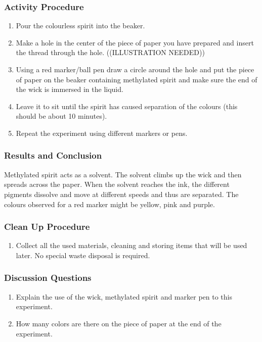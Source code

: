\subsubsection*{Activity Procedure}
\begin{enumerate}
\item{Pour the colourless spirit into the beaker.}
\item{Make a hole in the center of the piece of paper you have prepared and insert the thread through the hole. ((ILLUSTRATION NEEDED)) }
\item{Using a red marker/ball pen draw a circle around the hole and put the piece of paper on the beaker containing methylated spirit and make sure the end of the wick is immersed in the liquid.}
\item{Leave it to sit until the spirit has caused separation of the colours (this should be about 10 minutes).}
\item{Repeat the experiment using different markers or pens.}
\end{enumerate}

\subsubsection*{Results and Conclusion}
Methylated spirit acts as a solvent. The solvent climbs up the wick and then spreads across the paper.  When the solvent reaches the ink, the different pigments dissolve and move at different speeds and thus are separated. The colours observed for a red marker might be yellow, pink and purple.

\subsubsection*{Clean Up Procedure}
\begin{enumerate}
\item{Collect all the used materials, cleaning and storing items that will be used later. No special waste disposal is required.}
\end{enumerate}

\subsubsection*{Discussion Questions}
\begin{enumerate}
\item{Explain the use of the wick, methylated spirit and marker pen to this experiment.}
\item{How many colors are there on the piece of paper at the end of the experiment.}
\end{enumerate}


